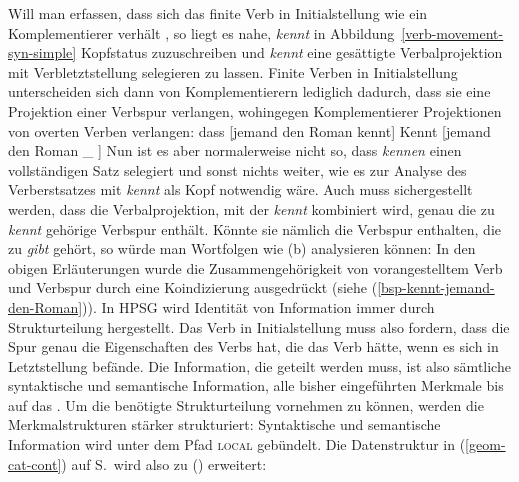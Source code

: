 Will man erfassen, dass sich das finite Verb in Initialstellung wie ein Komplementierer verhält
\citep{Hoehle97a}, so liegt es nahe, \emph{kennt} in
Abbildung~\ref{verb-movement-syn-simple} Kopfstatus zuzuschreiben und \emph{kennt} eine gesättigte
Verbalprojektion mit Verbletztstellung selegieren zu lassen. Finite Verben in Initialstellung
unterscheiden sich dann von Komplementierern lediglich dadurch, dass sie eine Projektion einer Verbspur
verlangen, wohingegen Komplementierer Projektionen von overten Verben verlangen:
\eal
\ex dass [jemand den Roman kennt]
\ex Kennt [jemand den Roman \_ ]
\zl
Nun ist es aber normalerweise nicht so, dass \emph{kennen} einen vollständigen Satz selegiert und
sonst nichts weiter, wie es zur Analyse des Verberstsatzes mit \emph{kennt} als Kopf notwendig
wäre. Auch muss sichergestellt werden, dass die Verbalprojektion, mit der \emph{kennt} kombiniert
wird, genau die zu \emph{kennt} gehörige Verbspur enthält. Könnte sie nämlich die Verbspur
enthalten, die zu \emph{gibt} gehört, so würde man Wortfolgen wie (b) analysieren können: 
\eal
{} 
\zl
In den obigen Erläuterungen wurde die Zusammengehörigkeit von vorangestelltem Verb und Verbspur
durch eine Koindizierung ausgedrückt (siehe (\ref{bsp-kennt-jemand-den-Roman})). In HPSG wird Identität von Information immer durch Strukturteilung
hergestellt. Das Verb in Initialstellung muss also fordern, dass die Spur genau die Eigenschaften des
Verbs hat, die das Verb hätte, wenn es sich in Letztstellung befände. Die Information, die geteilt
werden muss, ist also sämtliche syntaktische und semantische Information, \dash alle bisher eingeführten
Merkmale bis auf das \phonm. Um die benötigte Strukturteilung vornehmen zu können, werden die
Merkmalstrukturen stärker strukturiert: Syntaktische und semantische Information wird unter dem
Pfad \textsc{local} gebündelt. Die Datenstruktur in (\ref{geom-cat-cont}) auf S.\,\pageref{geom-cat-cont}
wird also zu () erweitert:
\ea
\label{geom-loc}
\z

